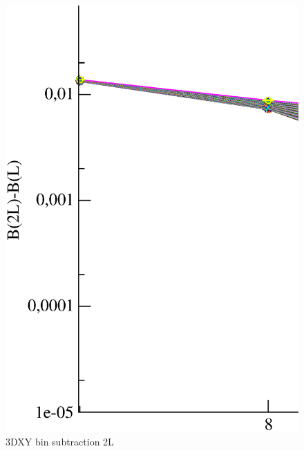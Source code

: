 \begin{figure}[!htpb]
  \centering
  \includegraphics[width=\textwidth]{./plots/3DXY/vsL/bin_subtraction_2L.eps}
  \caption{3DXY bin subtraction 2L}
\end{figure}

